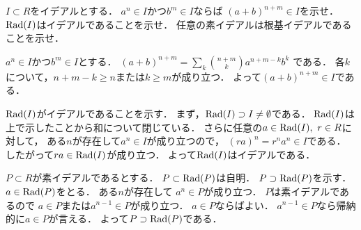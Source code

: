 \begin{prob}
  $I\subset R$をイデアルとする．
  $a^n \in I$かつ$b^m\in I$ならば
  $(a+b)^{n+m} \in I$を示せ．
  $\mathrm{Rad}(I)$はイデアルであることを示せ．
  任意の素イデアルは根基イデアルであることを示せ．
\end{prob}
\begin{ans}
  $a^n \in I$かつ$b^m\in I$とする．
  $(a+b)^{n+m} = \sum_{k} \binom{n+m}{k} a^{n+m-k}b^k$
  である．
  各$k$について，$n+m-k \ge n$または$k \ge m$が成り立つ．
  よって$(a+b)^{n+m} \in I$である．

  $\mathrm{Rad}(I)$がイデアルであることを示す．
  まず，$\mathrm{Rad}(I) \supset I \ne \emptyset $である．
  $\mathrm{Rad}(I)$は上で示したことから和について閉じている．
  さらに任意の$a \in \mathrm{Rad}(I), \ r\in R$に対して，
  ある$n$が存在して$ a^n \in I$が成り立つので，
  $ (ra)^n = r^n a^n \in I $である．
  したがって$ra \in \mathrm{Rad}(I)$が成り立つ．
  よって$\mathrm{Rad}(I)$はイデアルである．

  $P\subset R$が素イデアルであるとする．
  $P \subset \mathrm{Rad}(P)$は自明．
  $P \supset \mathrm{Rad}(P)$を示す．
  $ a\in \mathrm{Rad}(P)$をとる．
  ある$n$が存在して
  $ a^n \in P$が成り立つ．
  $P$は素イデアルであるので
  $a\in P$または$a^{n-1} \in P$が成り立つ．
  $a\in P$ならばよい．
  $a^{n-1} \in P$なら帰納的に$a\in P$が言える．
  よって$P \supset \mathrm{Rad}(P)$である．
\end{ans}
